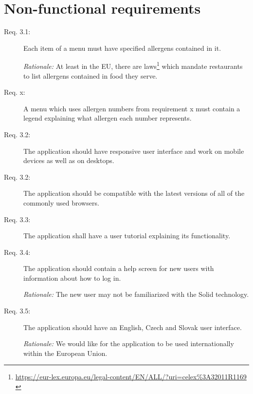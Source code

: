 \section{Non-functional requirements}
\begin{description}
    \item [Req. 3.1:] Each item of a menu must have specified allergens contained in it.
    
    \emph{Rationale:} At least in the EU, there are laws\footnote{\url{https://eur-lex.europa.eu/legal-content/EN/ALL/?uri=celex\%3A32011R1169}  \label{fnlabel}} which mandate restaurants to list allergens contained in food they serve.
    \item [Req. x:] A menu which uses allergen numbers from requirement x must contain a legend explaining what allergen each number represents.
    \item [Req. 3.2:] The application should have responsive user interface and work on mobile devices as well as on desktops.
    \item [Req. 3.2:] The application should be compatible with the latest versions of all of the commonly used browsers.
    \item [Req. 3.3:] The application shall have a user tutorial explaining its functionality.
    \item [Req. 3.4:] The application should contain a help screen for new users with information about how to log in.

    \emph{Rationale:} The new user may not be familiarized with the Solid technology.
    \item [Req. 3.5:] The application should have an English, Czech and Slovak user interface.

    \emph{Rationale:} We would like for the application to be used internationally within the European Union.
\end{description}

\vspace*{\fill}
